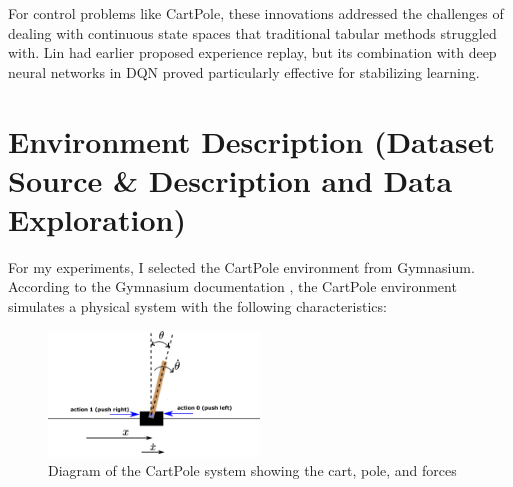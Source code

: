 \documentclass{article}
\begin{document}
For control problems like CartPole, these innovations addressed the challenges of dealing with continuous state spaces that traditional tabular methods struggled with. Lin \cite{lin1992} had earlier proposed experience replay, but its combination with deep neural networks in DQN proved particularly effective for stabilizing learning.

\section{Environment Description (Dataset Source \& Description and Data Exploration)}

For my experiments, I selected the CartPole environment from Gymnasium. According to the Gymnasium documentation \cite{gymnasium_cartpole}, the CartPole environment simulates a physical system with the following characteristics:

\begin{figure}[h]
\centering
\includegraphics[width=0.5\textwidth]{media/cartpole_diagram.png}
\caption{Diagram of the CartPole system showing the cart, pole, and forces \cite{haber_cartpole}}
\label{fig:cartpole}
\end{figure}
\end{document}
